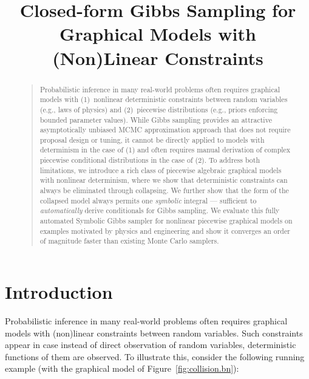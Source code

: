 \documentclass[letterpaper]{article}
\begin{document}
%
\title{Closed-form Gibbs Sampling for Graphical Models with (Non)Linear Constraints}
\maketitle


\begin{abstract}
\begin{quote}
Probabilistic inference in many real-world problems often requires
graphical models with (1)~nonlinear deterministic constraints between
random variables (e.g., laws of physics) and (2)~piecewise
distributions (e.g., priors enforcing bounded parameter values).
While Gibbs sampling provides an attractive asymptotically unbiased
MCMC approximation approach that does not require proposal design or
tuning, it cannot be directly applied to models with determinism in
the case of (1) and often requires manual derivation of complex
piecewise conditional distributions in the case of (2).  To address
both limitations, we introduce a rich class of piecewise algebraic
graphical models with nonlinear determinism, where we show that
deterministic constraints can always be eliminated through collapsing.
We further show that the form of the collapsed model always permits
one \emph{symbolic} integral --- sufficient to \emph{automatically}
derive conditionals for Gibbs sampling.  We evaluate this fully
automated Symbolic Gibbs sampler for nonlinear piecewise graphical
models on examples motivated by physics and engineering and show it
converges an order of magnitude faster than existing Monte Carlo
samplers.
\end{quote}
\end{abstract}


\section{Introduction}
\label{sect:intro}

\noindent 
Probabilistic inference in many real-world problems often requires graphical models with (non)linear constraints between random variables. 
Such constraints appear in case instead of direct observation of random variables, deterministic functions of them are observed. 
To illustrate this, consider the following running example (with the graphical model of Figure~\ref{fig:collision.bn}):
\end{document}
